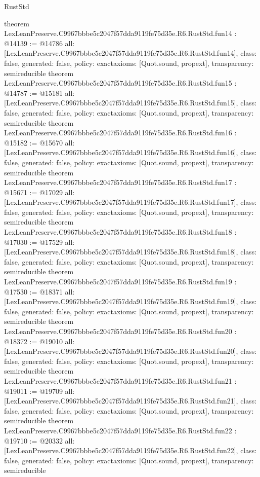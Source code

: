 \begin{lexlean}{RustStd}
\begin{coremodule}
{}
theorem LexLeanPreserve.C9967bbbe5c2047f57dda9119fe75d35e.R6.RustStd.fun14 : @14139 := @14786 {
  all: [LexLeanPreserve.C9967bbbe5c2047f57dda9119fe75d35e.R6.RustStd.fun14],
  class: false,
  generated: false,
  policy: exact{axioms: [Quot.sound, propext]},
  transparency: semireducible
}
theorem LexLeanPreserve.C9967bbbe5c2047f57dda9119fe75d35e.R6.RustStd.fun15 : @14787 := @15181 {
  all: [LexLeanPreserve.C9967bbbe5c2047f57dda9119fe75d35e.R6.RustStd.fun15],
  class: false,
  generated: false,
  policy: exact{axioms: [Quot.sound, propext]},
  transparency: semireducible
}
theorem LexLeanPreserve.C9967bbbe5c2047f57dda9119fe75d35e.R6.RustStd.fun16 : @15182 := @15670 {
  all: [LexLeanPreserve.C9967bbbe5c2047f57dda9119fe75d35e.R6.RustStd.fun16],
  class: false,
  generated: false,
  policy: exact{axioms: [Quot.sound, propext]},
  transparency: semireducible
}
theorem LexLeanPreserve.C9967bbbe5c2047f57dda9119fe75d35e.R6.RustStd.fun17 : @15671 := @17029 {
  all: [LexLeanPreserve.C9967bbbe5c2047f57dda9119fe75d35e.R6.RustStd.fun17],
  class: false,
  generated: false,
  policy: exact{axioms: [Quot.sound, propext]},
  transparency: semireducible
}
theorem LexLeanPreserve.C9967bbbe5c2047f57dda9119fe75d35e.R6.RustStd.fun18 : @17030 := @17529 {
  all: [LexLeanPreserve.C9967bbbe5c2047f57dda9119fe75d35e.R6.RustStd.fun18],
  class: false,
  generated: false,
  policy: exact{axioms: [Quot.sound, propext]},
  transparency: semireducible
}
theorem LexLeanPreserve.C9967bbbe5c2047f57dda9119fe75d35e.R6.RustStd.fun19 : @17530 := @18371 {
  all: [LexLeanPreserve.C9967bbbe5c2047f57dda9119fe75d35e.R6.RustStd.fun19],
  class: false,
  generated: false,
  policy: exact{axioms: [Quot.sound, propext]},
  transparency: semireducible
}
theorem LexLeanPreserve.C9967bbbe5c2047f57dda9119fe75d35e.R6.RustStd.fun20 : @18372 := @19010 {
  all: [LexLeanPreserve.C9967bbbe5c2047f57dda9119fe75d35e.R6.RustStd.fun20],
  class: false,
  generated: false,
  policy: exact{axioms: [Quot.sound, propext]},
  transparency: semireducible
}
theorem LexLeanPreserve.C9967bbbe5c2047f57dda9119fe75d35e.R6.RustStd.fun21 : @19011 := @19709 {
  all: [LexLeanPreserve.C9967bbbe5c2047f57dda9119fe75d35e.R6.RustStd.fun21],
  class: false,
  generated: false,
  policy: exact{axioms: [Quot.sound, propext]},
  transparency: semireducible
}
theorem LexLeanPreserve.C9967bbbe5c2047f57dda9119fe75d35e.R6.RustStd.fun22 : @19710 := @20332 {
  all: [LexLeanPreserve.C9967bbbe5c2047f57dda9119fe75d35e.R6.RustStd.fun22],
  class: false,
  generated: false,
  policy: exact{axioms: [Quot.sound, propext]},
  transparency: semireducible
}
\end{coremodule}
\end{lexlean}
